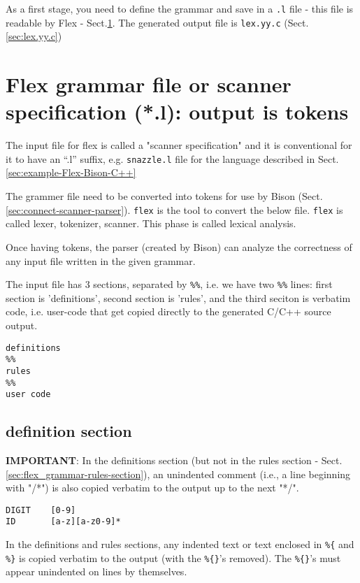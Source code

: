 As a first stage, you need to define the grammar and save in a \verb!.l! file -
this file is readable by Flex - Sect.\ref{sec:flex_grammar-file}. The generated
output file is \verb!lex.yy.c! (Sect.\ref{sec:lex.yy.c})

\section{Flex grammar file or scanner specification (*.l): output is tokens}
\label{sec:flex_grammar-file}

The input file for flex is called a "scanner specification" and it is
conventional for it to have an ``.l'' suffix, e.g. \verb!snazzle.l! file for the
language described in Sect.\ref{sec:example-Flex-Bison-C++}

The grammer file need to be converted into tokens for use by Bison
(Sect.\ref{sec:connect-scanner-parser}).
\verb!flex! is the tool to convert the below file. \verb!flex! is called 
lexer, tokenizer, scanner. This phase is called lexical analysis.

Once having tokens, the parser (created by Bison) can analyze the correctness of
any input file written in the given grammar.

The input file has 3 sections, separated by \verb!%%!, i.e. we have two
\verb!%%! lines: first section is 'definitions', second section is 'rules', and
the third seciton is verbatim code, i.e. user-code that get copied directly to
the generated C/C++ source output.

\begin{verbatim}
definitions
%%
rules
%%
user code
\end{verbatim}

\subsection{definition section}
\label{sec:flex_grammar-definitions-section}

{\bf IMPORTANT}: In the definitions section (but not in the rules section -
Sect.\ref{sec:flex_grammar-rules-section}), an unindented comment (i.e., a line
beginning with "/*") is also copied verbatim to the output up to the next "*/".

\begin{verbatim}
DIGIT    [0-9]
ID       [a-z][a-z0-9]*
\end{verbatim}

In the definitions and rules sections, any indented text or text enclosed in
\verb!%{! and \verb!%}! is copied verbatim to the output (with the \verb!%{}!'s
removed). The \verb!%{}!'s must appear unindented on lines by themselves.

